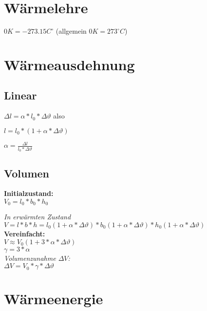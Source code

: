 \documentclass[a4paper]{article}
\begin{document}
\begin{multicols}{3}
  \section{Wärmelehre}
  $ 0 K = - 273.15 C^\circ $ (allgemein $ 0 K = 273^\circ C $)
  
  \section{Wärmeausdehnung}
  \subsection{Linear}
  
  $ \Delta l = \alpha * l_0 * \Delta \vartheta $ also
  
  $ l = l_0 * (1 + \alpha * \Delta \vartheta) $
  
  $ \alpha = \frac{\Delta l}{l_0 * \Delta \vartheta} $
  
  \subsection{Volumen}
  
  \textbf{Initialzustand:}\\
  
  $ V_0 = l_0 * b_0 * h_0 $
  
  \textit{In erwärmten Zustand}\\
  
  $ V = l * b * h = l_0 (1 + \alpha * \Delta \vartheta) * b_0 (1 + \alpha * \Delta \vartheta) * h_0 (1 + \alpha * \Delta \vartheta) $\\
  
  \textbf{Vereinfacht:}\\
  
  $ V \approx V_0 (1 + 3 * \alpha * \Delta \vartheta) $\\
  
  $ \gamma = 3 * \alpha $ \\
  
  \textit{Volumenzunahme $\Delta V$:}\\
  $ \Delta V = V_0 * \gamma  * \Delta \vartheta $ \\
  
  \section{Wärmeenergie}
  

\end{multicols}
\end{document}
